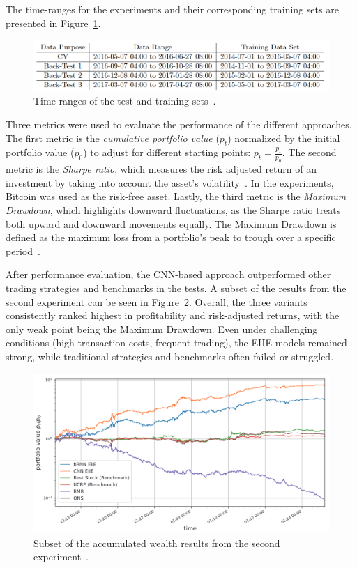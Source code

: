 \documentclass[a4paper,oneside,onecolumn,12pt]{book}
\begin{document}
	The time-ranges for the experiments and their corresponding training sets are presented in Figure~\ref{fig:article_tests}.
	\begin{figure}[H]
	\begin{center}
		\includegraphics[width=\linewidth]{kep/article_test_ranges.png}
		\caption{Time-ranges of the test and training sets~\cite{ADRLFFPMP}.}
		\label{fig:article_tests}
	\end{center}
	\end{figure}
	Three metrics were used to evaluate the performance of the different approaches. The first metric is the \textit{cumulative portfolio value} ($p_t$) normalized by the initial portfolio value ($p_0$) to adjust for different starting points: $p_t = \frac{p_t}{p_0}$. The second metric is the \textit{Sharpe ratio}, which measures the risk adjusted return of an investment by taking into account the asset's volatility~\cite{SRDFE}. In the experiments, Bitcoin was used as the risk-free asset. Lastly, the third metric is the \textit{Maximum Drawdown}, which highlights downward fluctuations, as the Sharpe ratio treats both upward and downward movements equally. The Maximum Drawdown is defined as the maximum loss from a portfolio's peak to trough over a specific period~\cite{MDDDWFC}.

	After performance evaluation, the CNN-based approach outperformed other trading strategies and benchmarks in the tests. A subset of the results from the second experiment can be seen in Figure~\ref{fig:eiie_results}. Overall, the three variants consistently ranked highest in profitability and risk-adjusted returns, with the only weak point being the Maximum Drawdown. Even under challenging conditions (high transaction costs, frequent trading), the EIIE models remained strong, while traditional strategies and benchmarks often failed or struggled. 
	\begin{figure}[H]
	\begin{center}
		\includegraphics[width=15cm]{kep/article_eiie_result.png}
		\caption{Subset of the accumulated wealth results from the second experiment~\cite{ADRLFFPMP}.}
		\label{fig:eiie_results}
	\end{center}
	\end{figure}
\end{document}

